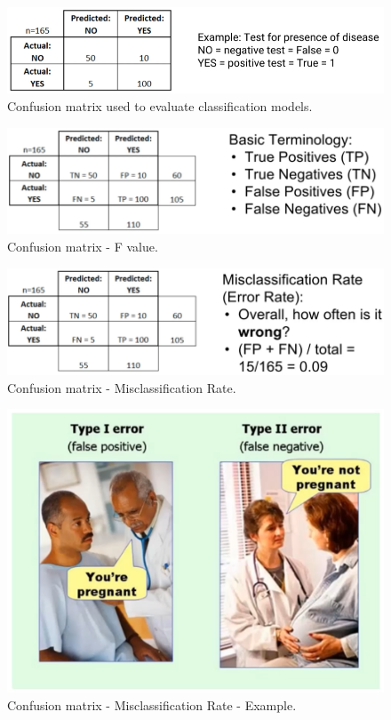 \documentclass{article}
\begin{document}
\begin{figure}[H]
\centering
\includegraphics[width=.9\linewidth]{pic/confusion-matrix.png}
\caption{Confusion matrix used to evaluate classification models.}
\label{confusion-matrix}
\end{figure}

\begin{figure}[H]
\centering
\includegraphics[width=.9\linewidth]{pic/confusion-matrix2.png}
\caption{Confusion matrix - F value.}
\label{confusion-matrix2}
\end{figure}

\begin{figure}[H]
\centering
\includegraphics[width=.9\linewidth]{pic/confusion-matrix3.png}
\caption{Confusion matrix - Misclassification Rate.}
\label{confusion-matrix3}
\end{figure}

\begin{figure}[H]
\centering
\includegraphics[width=.9\linewidth]{pic/confusion-matrix4.png}
\caption{Confusion matrix - Misclassification Rate - Example.}
\label{confusion-matrix4}
\end{figure}
\end{document}
